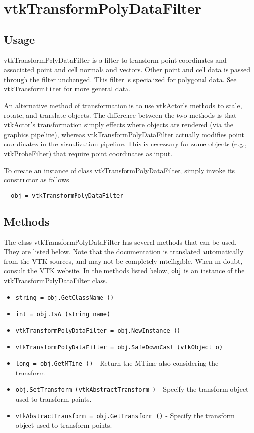 \section{vtkTransformPolyDataFilter}

\subsection{Usage}

 vtkTransformPolyDataFilter is a filter to transform point
 coordinates and associated point and cell normals and
 vectors. Other point and cell data is passed through the filter
 unchanged. This filter is specialized for polygonal data. See
 vtkTransformFilter for more general data.

 An alternative method of transformation is to use vtkActor's methods
 to scale, rotate, and translate objects. The difference between the
 two methods is that vtkActor's transformation simply effects where
 objects are rendered (via the graphics pipeline), whereas
 vtkTransformPolyDataFilter actually modifies point coordinates in the 
 visualization pipeline. This is necessary for some objects 
 (e.g., vtkProbeFilter) that require point coordinates as input.

To create an instance of class vtkTransformPolyDataFilter, simply
invoke its constructor as follows
\begin{verbatim}
  obj = vtkTransformPolyDataFilter
\end{verbatim}
\subsection{Methods}

The class vtkTransformPolyDataFilter has several methods that can be used.
  They are listed below.
Note that the documentation is translated automatically from the VTK sources,
and may not be completely intelligible.  When in doubt, consult the VTK website.
In the methods listed below, \verb|obj| is an instance of the vtkTransformPolyDataFilter class.
\begin{itemize}
\item  \verb|string = obj.GetClassName ()|

\item  \verb|int = obj.IsA (string name)|

\item  \verb|vtkTransformPolyDataFilter = obj.NewInstance ()|

\item  \verb|vtkTransformPolyDataFilter = obj.SafeDownCast (vtkObject o)|

\item  \verb|long = obj.GetMTime ()| -  Return the MTime also considering the transform.

\item  \verb|obj.SetTransform (vtkAbstractTransform )| -  Specify the transform object used to transform points.

\item  \verb|vtkAbstractTransform = obj.GetTransform ()| -  Specify the transform object used to transform points.

\end{itemize}
